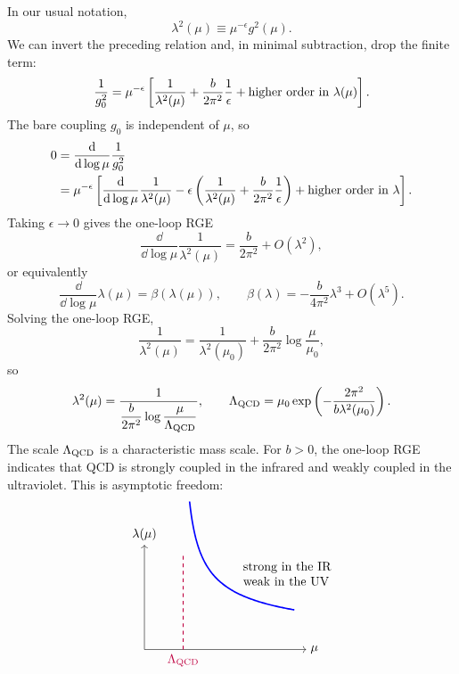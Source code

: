 In our usual notation,
\[
  \lambda^2(\mu)\equiv\mu^{-\epsilon}g^2(\mu).
\]
We can invert the preceding relation and, in minimal subtraction, drop the
finite term:
\[
  \frac{1}{g_0^2}
  =
  \mu^{-\epsilon}
  \left[
    \frac{1}{\lambda^2(\mu)}
    +\frac{b}{2\pi^2}\frac1{\epsilon}
    +\hbox{higher order in \(\lambda(\mu)\)}
  \right].
\]
The bare coupling \(g_0\) is independent of \(\mu\), so
\[
\begin{aligned}
  0
  &=
  \frac{\mathrm{d}}{\mathrm{d}\log\mu}\frac{1}{g_0^2}
\\
  &=
  \mu^{-\epsilon}
  \left[
    \frac{\mathrm{d}}{\mathrm{d}\log\mu}\frac{1}{\lambda^2(\mu)}
    -\epsilon
    \left(
      \frac{1}{\lambda^2(\mu)}
      +\frac{b}{2\pi^2}\frac1{\epsilon}
    \right)
    +\hbox{higher order in \(\lambda\)}
  \right].
\end{aligned}
\]
Taking \(\epsilon\to0\) gives the one-loop RGE
\[
  \frac{\dd}{\dd\log\mu}\frac{1}{\lambda^2(\mu)}
  =
  \frac{b}{2\pi^2}
  +O(\lambda^2),
\]
or equivalently
\[
  \frac{\dd}{\dd\log\mu}\lambda(\mu)
  =
  \beta(\lambda(\mu)),
  \qquad
  \beta(\lambda)
  =
  -\frac{b}{4\pi^2}\lambda^3+O(\lambda^5).
\]
Solving the one-loop RGE,
\[
  \frac{1}{\lambda^2(\mu)}
  =
  \frac{1}{\lambda^2(\mu_0)}
  +\frac{b}{2\pi^2}\log\frac{\mu}{\mu_0},
\]
so
\[
  \lambda^2(\mu)
  =
  \frac{1}{
    \displaystyle
    \frac{b}{2\pi^2}\log\frac{\mu}{\Lambda_{\rm QCD}}
  },
  \qquad
  \Lambda_{\rm QCD}
  =
  \mu_0
  \exp\left(-\frac{2\pi^2}{b\lambda^2(\mu_0)}\right).
\]
The scale \(\Lambda_{\rm QCD}\) is a characteristic mass scale.  For
\(b>0\), the one-loop RGE indicates that QCD is strongly coupled in the
infrared and weakly coupled in the ultraviolet.  This is asymptotic
freedom:
\[
\begin{tikzpicture}[scale=0.95,baseline={(0,-0.2)}]
  \draw[->] (0,0) -- (4.8,0) node[right] {\(\mu\)};
  \draw[->] (0,0) -- (0,3.1) node[above] {\(\lambda(\mu)\)};
  \draw[purple,dashed,thick] (1.15,0) -- (1.15,2.85);
  \node[purple,below] at (1.15,0) {\(\Lambda_{\rm QCD}\)};
  \draw[blue,very thick,domain=1.34:4.45,samples=120]
    plot (\x,{2.15/sqrt(\x-1.1)});
  \node[align=left,right] at (2.8,2.25)
    {strong in the IR\\weak in the UV};
\end{tikzpicture}
\]

